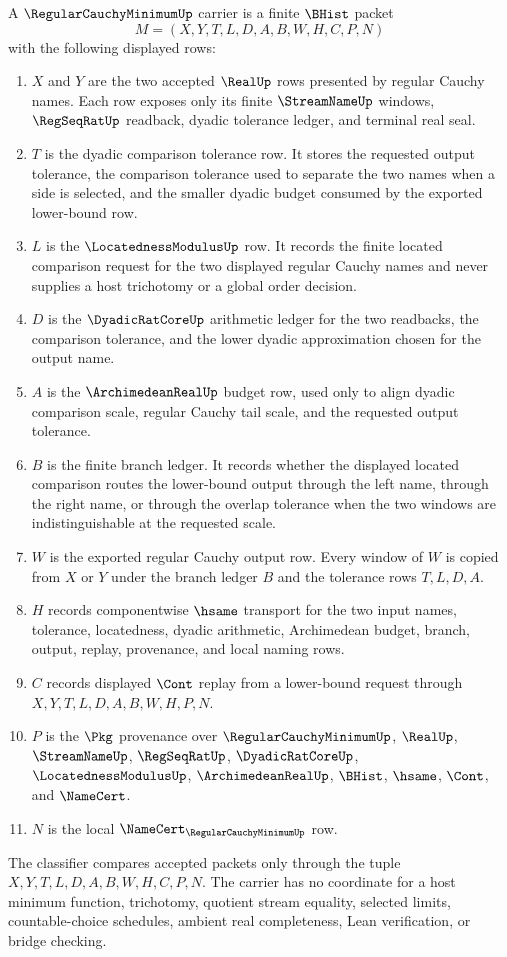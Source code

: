 \begin{definition}\label{def:regular-cauchy-minimum-carrier}
A $\RegularCauchyMinimumUp$ carrier is a finite $\BHist$ packet
$$
M=(X,Y,T,L,D,A,B,W,H,C,P,N)
$$
with the following displayed rows:
\begin{enumerate}
\item $X$ and $Y$ are the two accepted $\RealUp$ rows presented by regular Cauchy names. Each row exposes only its finite $\StreamNameUp$ windows, $\RegSeqRatUp$ readback, dyadic tolerance ledger, and terminal real seal.
\item $T$ is the dyadic comparison tolerance row. It stores the requested output tolerance, the comparison tolerance used to separate the two names when a side is selected, and the smaller dyadic budget consumed by the exported lower-bound row.
\item $L$ is the $\LocatednessModulusUp$ row. It records the finite located comparison request for the two displayed regular Cauchy names and never supplies a host trichotomy or a global order decision.
\item $D$ is the $\DyadicRatCoreUp$ arithmetic ledger for the two readbacks, the comparison tolerance, and the lower dyadic approximation chosen for the output name.
\item $A$ is the $\ArchimedeanRealUp$ budget row, used only to align dyadic comparison scale, regular Cauchy tail scale, and the requested output tolerance.
\item $B$ is the finite branch ledger. It records whether the displayed located comparison routes the lower-bound output through the left name, through the right name, or through the overlap tolerance when the two windows are indistinguishable at the requested scale.
\item $W$ is the exported regular Cauchy output row. Every window of $W$ is copied from $X$ or $Y$ under the branch ledger $B$ and the tolerance rows $T,L,D,A$.
\item $H$ records componentwise $\hsame$ transport for the two input names, tolerance, locatedness, dyadic arithmetic, Archimedean budget, branch, output, replay, provenance, and local naming rows.
\item $C$ records displayed $\Cont$ replay from a lower-bound request through $X,Y,T,L,D,A,B,W,H,P,N$.
\item $P$ is the $\Pkg$ provenance over $\RegularCauchyMinimumUp$, $\RealUp$, $\StreamNameUp$, $\RegSeqRatUp$, $\DyadicRatCoreUp$, $\LocatednessModulusUp$, $\ArchimedeanRealUp$, $\BHist$, $\hsame$, $\Cont$, and $\NameCert$.
\item $N$ is the local $\NameCert_{\RegularCauchyMinimumUp}$ row.
\end{enumerate}
The classifier compares accepted packets only through the tuple $X,Y,T,L,D,A,B,W,H,C,P,N$. The carrier has no coordinate for a host minimum function, trichotomy, quotient stream equality, selected limits, countable-choice schedules, ambient real completeness, Lean verification, or bridge checking.
\end{definition}

